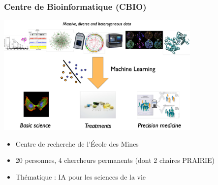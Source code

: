 \documentclass[sans,14pt]{beamer}
\newcommand{\blue}[1]{{\color{MyBlue}{\textbf{#1}}}}
\newcommand{\black}[1]{{\color{MyDarkGrey}{\textbf{#1}}}}
\begin{document}
{%

\begin{frame}
  \frametitle{Centre de Bioinformatique (CBIO)}
  \centerline{\includegraphics[width=0.75\textwidth]{figures/cbio}}
  \begin{itemize}
    \item Centre de recherche de l'\'Ecole des Mines
    \item 20 personnes, 4 chercheurs permanents (dont 2 chaires PRAIRIE)
    \item Thématique : IA pour les sciences de la vie
  \end{itemize}
\end{frame}


}
\end{document}
